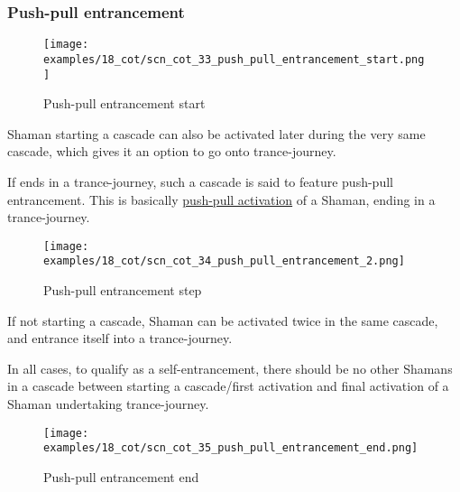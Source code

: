 \clearpage %

\subsubsection*{Push-pull entrancement}

\noindent
\begin{wrapfigure}[9]{l}{0.4\textwidth}
\centering
\texttt{[image: examples/18\_cot/scn\_cot\_33\_push\_pull\_entrancement\_start.png]}
\caption{Push-pull entrancement start}
\label{fig:star/scn_cot_33_push_pull_entrancement_start}
\end{wrapfigure}
Shaman starting a cascade can also be activated later during the very same cascade, which gives it an
option to go onto trance-journey.

If ends in a trance-journey, such a cascade is said to feature push-pull entrancement. This is basically
\hyperref[sec:Terms/Push-pull activation]{push-pull activation} of a Shaman, ending in a trance-journey.

\vspace*{0.05\textheight}
\noindent
\begin{wrapfigure}[11]{l}{0.4\textwidth}
\centering
\texttt{[image: examples/18\_cot/scn\_cot\_34\_push\_pull\_entrancement\_2.png]}
\caption{Push-pull entrancement step}
\label{fig:star/scn_cot_34_push_pull_entrancement_2}
\end{wrapfigure}
If not starting a cascade, Shaman can be activated twice in the same cascade, and entrance itself
into a trance-journey.

In all cases, to qualify as a self-entrancement, there should be no other Shamans in a cascade
between starting a cascade/first activation and final activation of a Shaman undertaking
trance-journey.

\clearpage %

\noindent
\begin{figure}[!h]
\texttt{[image: examples/18\_cot/scn\_cot\_35\_push\_pull\_entrancement\_end.png]}
\caption{Push-pull entrancement end}
\label{fig:scn_cot_35_push_pull_entrancement_end}
\end{figure}

